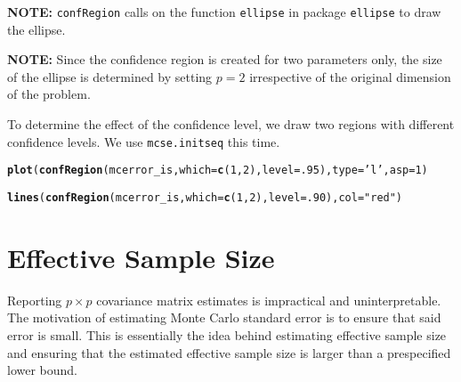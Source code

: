 \documentclass[11pt]{article}\usepackage[]{graphicx}\usepackage[]{color}
\makeatletter
\newcommand{\hlnum}[1]{\textcolor[rgb]{0.686,0.059,0.569}{#1}}%
\newcommand{\hlstr}[1]{\textcolor[rgb]{0.192,0.494,0.8}{#1}}%
\newcommand{\hlstd}[1]{\textcolor[rgb]{0.345,0.345,0.345}{#1}}%
\newcommand{\hlkwc}[1]{\textcolor[rgb]{0.333,0.667,0.333}{#1}}%
\newcommand{\hlkwd}[1]{\textcolor[rgb]{0.737,0.353,0.396}{\textbf{#1}}}%
\newenvironment{kframe}{%
 \def\at@end@of@kframe{}%
 \ifinner\ifhmode%
  \def\at@end@of@kframe{\end{minipage}}%
  \begin{minipage}{\columnwidth}%
 \fi\fi%
 \def\FrameCommand##1{\hskip\@totalleftmargin \hskip-\fboxsep
 \colorbox{shadecolor}{##1}\hskip-\fboxsep
     \hskip-\linewidth \hskip-\@totalleftmargin \hskip\columnwidth}%
 \MakeFramed {\advance\hsize-\width
   \@totalleftmargin\z@ \linewidth\hsize
   \@setminipage}}%
 {\par\unskip\endMakeFramed%
 \at@end@of@kframe}
\newenvironment{knitrout}{}{} %
\makeatother
\begin{document}
\bigskip
\textbf{NOTE: } \texttt{confRegion} calls on the function \texttt{ellipse} in package \texttt{ellipse} to draw the ellipse.

\bigskip
\textbf{NOTE: } Since the confidence region is created for two parameters only, the size of the ellipse is determined by setting $p = 2$ irrespective of the original dimension of the problem.

\bigskip
To determine the effect of the confidence level, we draw two regions with different confidence levels. We use \texttt{mcse.initseq} this time.

\begin{knitrout}
\color{fgcolor}\begin{kframe}
\begin{alltt}
\hlkwd{plot}\hlstd{(}\hlkwd{confRegion}\hlstd{(mcerror_is,} \hlkwc{which} \hlstd{=} \hlkwd{c}\hlstd{(}\hlnum{1}\hlstd{,}\hlnum{2}\hlstd{),} \hlkwc{level} \hlstd{=} \hlnum{.95}\hlstd{),} \hlkwc{type} \hlstd{=} \hlstr{'l'}\hlstd{,} \hlkwc{asp} \hlstd{=} \hlnum{1}\hlstd{)}
\end{alltt}


{\ttfamily\noindent\bfseries\color{errorcolor}{\#\# Error in confRegion(mcerror\_is, which = c(1, 2), level = 0.95): object 'mcerror\_is' not found}}\begin{alltt}
\hlkwd{lines}\hlstd{(}\hlkwd{confRegion}\hlstd{(mcerror_is,} \hlkwc{which} \hlstd{=} \hlkwd{c}\hlstd{(}\hlnum{1}\hlstd{,}\hlnum{2}\hlstd{),} \hlkwc{level} \hlstd{=} \hlnum{.90}\hlstd{),} \hlkwc{col} \hlstd{=} \hlstr{"red"}\hlstd{)}
\end{alltt}


{\ttfamily\noindent\bfseries\color{errorcolor}{\#\# Error in confRegion(mcerror\_is, which = c(1, 2), level = 0.9): object 'mcerror\_is' not found}}\end{kframe}
\end{knitrout}
  
\section{Effective Sample Size}
Reporting $p \times p$ covariance matrix estimates is impractical and uninterpretable. The motivation of estimating Monte Carlo standard error is to ensure that said error is small. This is essentially the idea behind estimating effective sample size and ensuring that the estimated effective sample size is larger than a prespecified lower bound.
\end{document}
